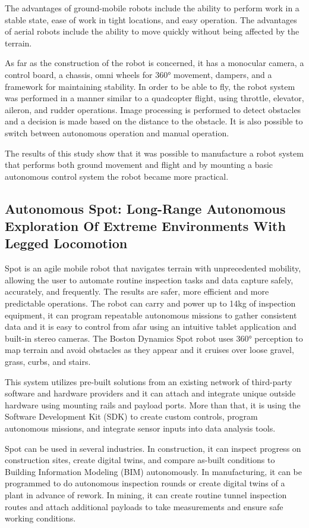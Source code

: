 \documentclass[12pt, twoside]{article}
\begin{document}
The advantages of ground-mobile robots include the ability to perform work in a stable state, ease of work in tight locations, and easy operation. The advantages of aerial robots include the ability to move quickly without being affected by the terrain.

As far as the construction of the robot is concerned, it has a monocular camera, a control board,  a chassis, omni wheels for 360° movement, dampers, and a framework for maintaining stability. In order to be able to fly, the robot system was performed in a manner similar to a quadcopter flight, using throttle, elevator, aileron, and rudder operations. Image processing is performed to detect obstacles and a decision is made based on the distance to the obstacle. It is also possible to switch between autonomous operation and manual operation.

The results of this study show that it was possible to manufacture a robot system that performs both ground movement and flight and by mounting a basic autonomous control system the robot became more practical. 


\subsection{Autonomous Spot: Long-Range Autonomous Exploration Of Extreme Environments With Legged Locomotion\cite{5}}
Spot is an agile mobile robot that navigates terrain with unprecedented mobility, allowing the user to automate routine inspection tasks and data capture safely, accurately, and frequently. The results are safer, more efficient and more predictable operations. The robot can carry and power up to 14kg of inspection equipment, it can program repeatable autonomous missions to gather consistent data and it is easy to control from afar using an intuitive tablet application and built-in stereo cameras. The Boston Dynamics Spot robot uses 360° perception to map terrain and avoid obstacles as they appear and it cruises over loose gravel, grass, curbs, and stairs.

This system utilizes pre-built solutions from an existing network of third-party software and hardware providers and it can attach and integrate unique outside hardware using mounting rails and payload ports. More than that, it is using the Software Development Kit (SDK) to create custom controls, program autonomous missions, and integrate sensor inputs into data analysis tools.

Spot can be used in several industries. In construction, it can inspect progress on construction sites, create digital twins, and compare as-built conditions to Building Information Modeling (BIM) autonomously. In manufacturing, it can be programmed to do autonomous inspection rounds or create digital twins of a plant in advance of rework. In mining, it can create routine tunnel inspection routes and attach additional payloads to take measurements and ensure safe working conditions. 
\end{document}
